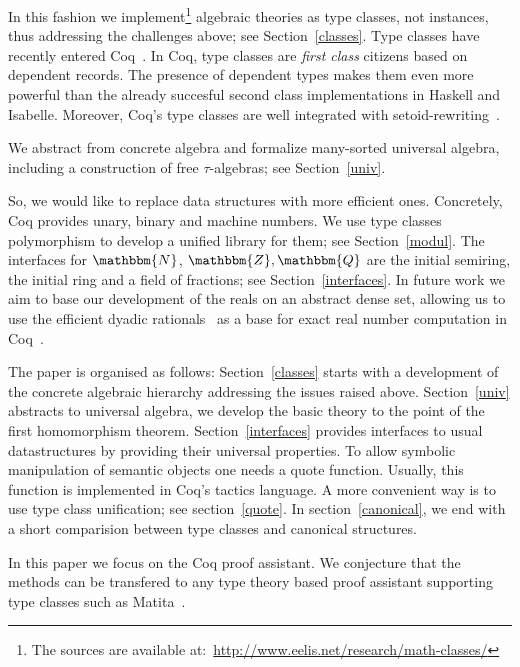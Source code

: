 \documentclass[a4paper,10pt, runningheads]{llncs}
\newcommand{\N}{\ensuremath{\mathbbm{N}}}
\newcommand{\Z}{\ensuremath{\mathbbm{Z}}}
\newcommand{\Q}{\ensuremath{\mathbbm{Q}}}
\begin{document}
In this fashion we implement\footnote{The sources are available
at:~\url{http://www.eelis.net/research/math-classes/}}
 algebraic theories as type classes, not instances, thus addressing the
challenges above; see Section~\ref{classes}. Type classes have recently entered
Coq~\cite{DBLP:conf/tphol/SozeauO08}. In Coq,
type classes are \emph{first class} citizens based on dependent records. The presence of dependent types makes them even more
powerful than the already succesful second class implementations in Haskell and Isabelle. Moreover,
Coq's type classes are well integrated with setoid-rewriting~\cite{Setoid-rewrite}.

We abstract from concrete algebra and formalize many-sorted universal algebra, including a
construction of free $\tau$-algebras; see Section~\ref{univ}.


So, we would like to replace data structures with more efficient ones. Concretely,
Coq provides unary, binary and machine numbers. We use type classes polymorphism to
develop a unified library for them; see Section~\ref{modul}.
The interfaces for $\N$, $\Z,\Q$ are the initial semiring, the initial ring and a field of
fractions; see Section~\ref{interfaces}. In future work we aim to base our development of the reals
on an abstract dense set, allowing us to use the efficient dyadic
rationals~\cite{boldo2009combining} as a base for exact real number computation in
Coq~\cite{Riemann,Oconnor:real}.

The paper is organised as follows: Section~\ref{classes} starts with a development of the concrete
algebraic hierarchy addressing the issues raised above. Section~\ref{univ} abstracts to universal
algebra, we develop the basic theory to the point of the first homomorphism theorem.
Section~\ref{interfaces} provides interfaces to usual datastructures by providing their universal
properties. To allow symbolic manipulation of semantic objects one needs a quote function. Usually,
this function is implemented in Coq's tactics language. A more convenient way is to use type class
unification; see section~\ref{quote}. In section~\ref{canonical}, we end with a short comparision
between type classes and canonical structures.

In this paper we focus on the Coq proof assistant. We conjecture that the methods can be transfered
to any type theory based proof assistant supporting type classes such as
Matita~\cite{asperti2007user}.
\end{document}
